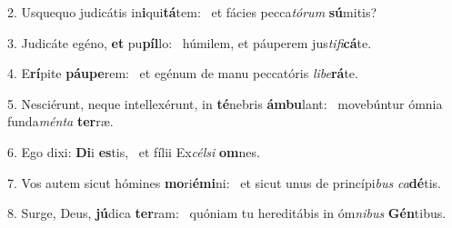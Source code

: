 2. Usquequo judicátis in\textbf{i}qui\textbf{tá}tem: \ast\  et fácies pecca\textit{tó}\textit{rum} \textbf{sú}mitis?\

3. Judicáte egéno, \textbf{et} pu\textbf{píl}lo: \ast\  húmilem, et páuperem jus\textit{ti}\textit{fi}\textbf{cá}te.\

4. E\textbf{rí}pite \textbf{páu}\textbf{pe}rem: \ast\  et egénum de manu peccatóris \textit{li}\textit{be}\textbf{rá}te.\

5. Nesciérunt, neque intellexérunt, in \textbf{té}nebris \textbf{ám}\textbf{bu}lant: \ast\  movebúntur ómnia funda\textit{mén}\textit{ta} \textbf{ter}ræ.\

6. Ego dixi: \textbf{Di}i \textbf{es}tis, \ast\  et fílii Ex\textit{cél}\textit{si} \textbf{om}nes.\

7. Vos autem sicut hómines \textbf{mo}ri\textbf{é}\textbf{mi}ni: \ast\  et sicut unus de princípi\textit{bus} \textit{ca}\textbf{dé}tis.\

8. Surge, Deus, \textbf{jú}dica \textbf{ter}ram: \ast\  quóniam tu hereditábis in óm\textit{ni}\textit{bus} \textbf{Gén}tibus.\

